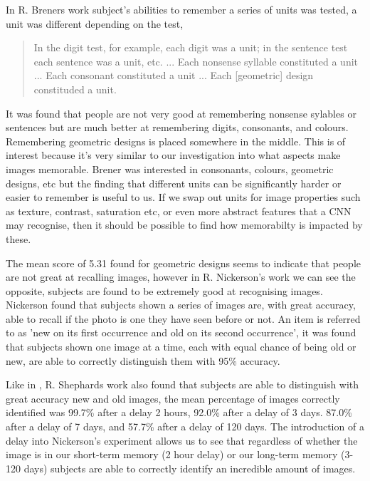 \documentclass{UoYCSproject}
\begin{document}
In R. Breners work \cite{BrenerMemorySpan} subject's abilities to remember a series of units was tested, a unit was different depending on the test, 
\begin{quote}
    In the digit test, for example, each digit was a unit; in the sentence test each sentence was a unit, etc. ... Each nonsense syllable constituted a unit ... Each consonant constituted a unit ... Each [geometric] design constituded a unit. \cite[p.468]{BrenerMemorySpan}
\end{quote}

It was found that people are not very good at remembering nonsense sylables or sentences but are much better at remembering digits, consonants, and colours. Remembering geometric designs is placed somewhere in the middle. This is of interest because it's very similar to our investigation into what aspects make images memorable. Brener was interested in consonants, colours, geometric designs, etc but the finding that different units can be significantly harder or easier to remember is useful to us. If we swap out units for image properties such as texture, contrast, saturation etc, or even more abstract features that a CNN may recognise, then it should be possible to find how memorabilty is impacted by these.   

The mean score of 5.31 found for geometric designs seems to indicate that people are not great at recalling images, however in R. Nickerson's work \cite{NickersonShortTermMemory} we can see the opposite, subjects are found to be extremely good at recognising images. Nickerson found that subjects shown a series of images are, with great accuracy, able to recall if the photo is one they have seen before or not. An item is referred to as 'new on its first occurrence and old on its second occurrence'\cite[p.156]{NickersonShortTermMemory}, it was found that subjects shown one image at a time, each with equal chance of being old or new, are able to correctly distinguish them with 95\% accuracy. 

Like in \cite{NickersonShortTermMemory},  R. Shephards work \cite{ShepardRecognition} also found that subjects are able to distinguish with great accuracy new and old images, the mean percentage of images correctly identified was 99.7\% after a delay 2 hours, 92.0\% after a delay of 3 days. 87.0\% after a delay of 7 days, and 57.7\% after a delay of 120 days. The introduction of a delay into Nickerson's experiment allows us to see that regardless of whether the image is in our short-term memory (2 hour delay) or our long-term memory (3-120 days) subjects are able to correctly identify an incredible amount of images. 
\end{document}
